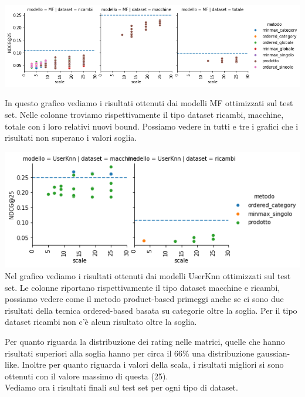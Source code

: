 \includegraphics[width=16cm]{figures/validazione_mf.png}

In questo grafico vediamo i risultati ottenuti dai modelli MF ottimizzati sul test set. Nelle colonne troviamo rispettivamente il tipo dataset ricambi, macchine, totale con i loro relativi nuovi bound. Possiamo vedere in tutti e tre i grafici che i risultati non superano i valori soglia.

\includegraphics[width=16cm]{figures/validazione_userknn.png}\\
Nel grafico vediamo i risultati ottenuti dai modelli UserKnn ottimizzati sul test set. Le colonne riportano rispettivamente il tipo dataset macchine e ricambi, possiamo vedere come il metodo product-based primeggi anche se ci sono due risultati della tecnica ordered-based basata su categorie oltre la soglia. Per il tipo dataset ricambi non c'è alcun risultato oltre la soglia.

Per quanto riguarda la distribuzione dei rating nelle matrici, quelle che hanno risultati superiori alla soglia hanno per circa il 66\% una distribuzione gaussian-like. Inoltre per quanto riguarda i valori della scala, i risultati migliori si sono ottenuti con il valore massimo di questa (25).\\
Vediamo ora i risultati finali sul test set per ogni tipo di dataset.\\

